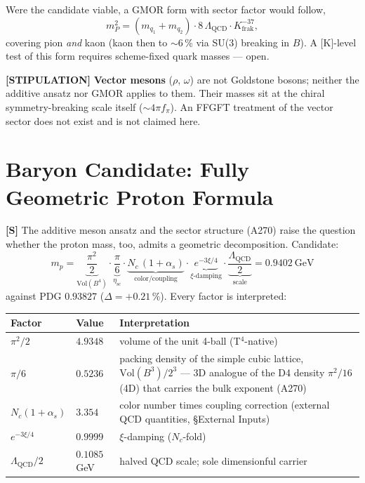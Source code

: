 Were the candidate viable, a GMOR form with sector factor would follow,
\[
  m_P^2 = (m_{q_1}+m_{q_2})\cdot 8\,\Lambda_\text{QCD}
  \cdot K_\text{frak}^{-37},
\]
covering pion \emph{and} kaon (kaon then to $\sim$6\,\% via SU(3)
breaking in $B$). A [K]-level test of this form requires scheme-fixed
quark masses --- open.

\medskip
\textbf{[STIPULATION]} \textbf{Vector mesons} ($\rho$, $\omega$) are
not Goldstone bosons; neither the additive ansatz nor GMOR applies to
them. Their masses sit at the chiral symmetry-breaking scale itself
($\sim 4\pi f_\pi$). An FFGFT treatment of the vector sector does not
exist and is not claimed here.

\section{Baryon Candidate: Fully Geometric Proton Formula}

\textbf{[S]} The additive meson ansatz and the sector structure (A270)
raise the question whether the proton mass, too, admits a geometric
decomposition. Candidate:
\[
  m_p = \underbrace{\frac{\pi^2}{2}}_{\text{Vol}(B^4)}
  \cdot \underbrace{\frac{\pi}{6}}_{\eta_\text{sc}}
  \cdot \underbrace{N_c\,(1+\alpha_s)}_{\text{color/coupling}}
  \cdot \underbrace{e^{-3\xi/4}}_{\xi\text{-damping}}
  \cdot \underbrace{\frac{\Lambda_\text{QCD}}{2}}_{\text{scale}}
  = 0{.}9402\ \text{GeV}
\]
against PDG $0{.}93827$ ($\Delta = +0{.}21\,\%$). Every factor is
interpreted:

\begin{center}
\renewcommand{\arraystretch}{1.3}
{\small\begin{tabular}{llp{6.2cm}}
\toprule
Factor & Value & Interpretation \\
\midrule
$\pi^2/2$ & $4{.}9348$ & volume of the unit 4-ball (T$^4$-native) \\
$\pi/6$ & $0{.}5236$ & packing density of the simple cubic lattice,
$\text{Vol}(B^3)/2^3$ --- 3D analogue of the D4 density $\pi^2/16$
(4D) that carries the bulk exponent (A270) \\
$N_c(1+\alpha_s)$ & $3{.}354$ & color number times coupling correction
(external QCD quantities, \S{}External Inputs) \\
$e^{-3\xi/4}$ & $0{.}9999$ & $\xi$-damping ($N_c$-fold) \\
$\Lambda_\text{QCD}/2$ & $0{.}1085$\,GeV & halved QCD scale; sole
dimensionful carrier \\
\bottomrule
\end{tabular}}
\renewcommand{\arraystretch}{1.0}
\end{center}

